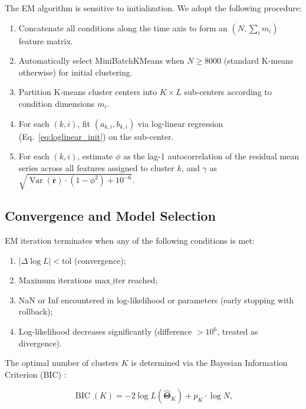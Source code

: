 \documentclass[12pt,a4paper]{article}
\DeclareMathOperator{\var}{Var}
\begin{document}
The EM algorithm is sensitive to initialization. We adopt the following procedure:

\begin{enumerate}[leftmargin=*]
    \item Concatenate all conditions along the time axis to form an $(N, \sum_i m_i)$ feature matrix.
    \item Automatically select MiniBatchKMeans \cite{sculley2010web} when $N \geq 8000$ (standard K-means otherwise) for initial clustering.
    \item Partition K-means cluster centers into $K \times L$ sub-centers according to condition dimensions $m_i$.
    \item For each $(k,i)$, fit $(a_{k,i}, b_{k,i})$ via log-linear regression (Eq.~\ref{eq:loglinear_init}) on the sub-center.
    \item For each $(k,i)$, estimate $\phi$ as the lag-1 autocorrelation of the residual mean series across all features assigned to cluster $k$, and $\gamma$ as $\sqrt{\var(\bar{\bm{r}}) \cdot (1 - \phi^2) + 10^{-6}}$.
\end{enumerate}

\subsection{Convergence and Model Selection}

EM iteration terminates when any of the following conditions is met:

\begin{enumerate}[leftmargin=*]
    \item $|\Delta \log L| < \text{tol}$ (convergence);
    \item Maximum iterations $\text{max\_iter}$ reached;
    \item NaN or Inf encountered in log-likelihood or parameters (early stopping with rollback);
    \item Log-likelihood decreases significantly (difference $> 10^6$, treated as divergence).
\end{enumerate}

The optimal number of clusters $K$ is determined via the Bayesian Information Criterion (BIC) \cite{schwarz1978estimating}:

\begin{equation}\label{eq:bic}
    \operatorname{BIC}(K) = -2 \log L(\hat{\bm{\Theta}}_K) + p_K \cdot \log N,
\end{equation}
\end{document}
